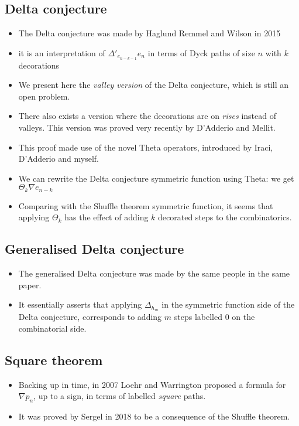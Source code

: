 \documentclass[12pt]{article}
\begin{document}
\subsection{Delta conjecture}
\begin{itemize}
    \item The Delta conjecture was made by Haglund Remmel and Wilson in 2015
    \item it is an interpretation of $\Delta'_{e_{n-k-1}}e_n$ in terms of Dyck paths of size $n$ with $k$ decorations
    \item We present here the \emph{valley version} of the Delta conjecture, which is still an open problem. 
    \item There also exists a version where the decorations are on \emph{rises} instead of valleys. This version was proved very recently by D'Adderio and Mellit. 
    \item This proof made use of the novel Theta operators, introduced by Iraci, D'Adderio and myself. 
    \item We can rewrite the Delta conjecture symmetric function using Theta: we get $\Theta_k \nabla e_{n-k}$
    \item Comparing with the Shuffle theorem symmetric function, it seems that applying $\Theta_k$ has the effect of adding $k$ decorated steps to the combinatorics.
\end{itemize}

\subsection{Generalised Delta conjecture}
\begin{itemize}
    \item The generalised Delta conjecture was made by the same people in the same paper.
    \item It essentially asserts that applying $\Delta_{h_m}$ in the symmetric function side of the Delta conjecture, corresponds to adding $m$ steps labelled $0$ on the combinatorial side. 
\end{itemize}

\subsection{Square theorem}
\begin{itemize}
    \item Backing up in time, in 2007 Loehr and Warrington proposed a formula for $\nabla p_n$, up to a sign, in terms of labelled \emph{square} paths.
    \item It was proved by Sergel in 2018 to be a consequence of the Shuffle theorem.
\end{itemize}
\end{document}
